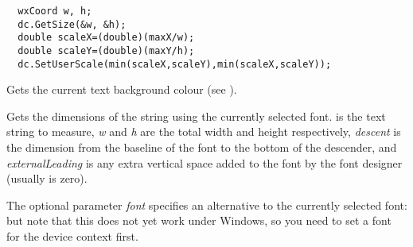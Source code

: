 \begin{verbatim}
  wxCoord w, h;
  dc.GetSize(&w, &h);
  double scaleX=(double)(maxX/w);
  double scaleY=(double)(maxY/h);
  dc.SetUserScale(min(scaleX,scaleY),min(scaleX,scaleY));
\end{verbatim}



\label{wxdcgettextbackground}



Gets the current text background colour (see ).

\label{wxdcgettextextent}


Gets the dimensions of the string using the currently selected font.
 is the text string to measure, {\it w} and {\it h} are
the total width and height respectively, {\it descent} is the
dimension from the baseline of the font to the bottom of the
descender, and {\it externalLeading} is any extra vertical space added
to the font by the font designer (usually is zero).

The optional parameter {\it font} specifies an alternative
to the currently selected font: but note that this does not
yet work under Windows, so you need to set a font for
the device context first.


